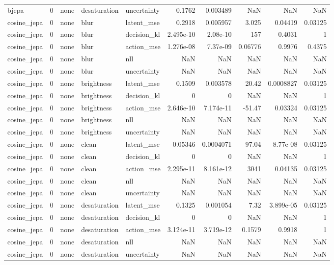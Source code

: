 \begin{tabular}{lrlllrrrrr}
bjepa & 0 & none & desaturation & uncertainty & 0.1762 & 0.003489 & NaN & NaN & NaN \\
cosine\_jepa & 0 & none & blur & latent\_mse & 0.2918 & 0.005957 & 3.025 & 0.04419 & 0.03125 \\
cosine\_jepa & 0 & none & blur & decision\_kl & 2.495e-10 & 2.08e-10 & 157 & 0.4031 & 1 \\
cosine\_jepa & 0 & none & blur & action\_mse & 1.276e-08 & 7.37e-09 & 0.06776 & 0.9976 & 0.4375 \\
cosine\_jepa & 0 & none & blur & nll & NaN & NaN & NaN & NaN & NaN \\
cosine\_jepa & 0 & none & blur & uncertainty & NaN & NaN & NaN & NaN & NaN \\
cosine\_jepa & 0 & none & brightness & latent\_mse & 0.1509 & 0.003578 & 20.42 & 0.0008827 & 0.03125 \\
cosine\_jepa & 0 & none & brightness & decision\_kl & 0 & 0 & NaN & NaN & 1 \\
cosine\_jepa & 0 & none & brightness & action\_mse & 2.646e-10 & 7.174e-11 & -51.47 & 0.03324 & 0.03125 \\
cosine\_jepa & 0 & none & brightness & nll & NaN & NaN & NaN & NaN & NaN \\
cosine\_jepa & 0 & none & brightness & uncertainty & NaN & NaN & NaN & NaN & NaN \\
cosine\_jepa & 0 & none & clean & latent\_mse & 0.05346 & 0.0004071 & 97.04 & 8.77e-08 & 0.03125 \\
cosine\_jepa & 0 & none & clean & decision\_kl & 0 & 0 & NaN & NaN & 1 \\
cosine\_jepa & 0 & none & clean & action\_mse & 2.295e-11 & 8.161e-12 & 3041 & 0.04135 & 0.03125 \\
cosine\_jepa & 0 & none & clean & nll & NaN & NaN & NaN & NaN & NaN \\
cosine\_jepa & 0 & none & clean & uncertainty & NaN & NaN & NaN & NaN & NaN \\
cosine\_jepa & 0 & none & desaturation & latent\_mse & 0.1325 & 0.001054 & 7.32 & 3.899e-05 & 0.03125 \\
cosine\_jepa & 0 & none & desaturation & decision\_kl & 0 & 0 & NaN & NaN & 1 \\
cosine\_jepa & 0 & none & desaturation & action\_mse & 3.124e-11 & 3.719e-12 & 0.1579 & 0.9918 & 1 \\
cosine\_jepa & 0 & none & desaturation & nll & NaN & NaN & NaN & NaN & NaN \\
cosine\_jepa & 0 & none & desaturation & uncertainty & NaN & NaN & NaN & NaN & NaN \\

\end{tabular}
